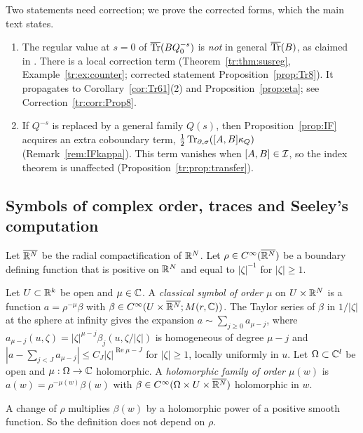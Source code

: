 Two statements need correction; we prove the corrected forms, which the
main text states.
\begin{enumerate}
\item The regular value at \(s=0\) of \(\overline{\operatorname{Tr}}(BQ_0^{-s})\) is \emph{not} in
general \(\overline{\operatorname{Tr}}(B)\), as claimed in \cite[Prop.~8]{MN}. There
is a local correction term (Theorem~\ref{tr:thm:susreg},
Example~\ref{tr:ex:counter}; corrected statement
Proposition~\ref{prop:Tr8}). It propagates to
Corollary~\ref{cor:Tr61}(2) and Proposition~\ref{prop:eta}; see
Correction~\ref{tr:corr:Prop8}.
\item If \(Q^{-s}\) is replaced by a general family \(Q(s)\), then
Proposition~\ref{prop:IF} acquires an extra coboundary term,
\(\frac12\operatorname{Tr}_{\partial,\sigma}([A,B]\kappa_Q)\) (Remark~\ref{rem:IFkappa}). This term vanishes
when \([A,B]\in\mathcal I\), so the index theorem is unaffected
(Proposition~\ref{tr:prop:transfer}).
\end{enumerate}

\subsection{Symbols of complex order, traces and Seeley's computation}
\label{tr:subsec:prelim}

Let \(\overline{\mathbb R^{N}}\) be the radial compactification of \(\mathbb R^N\). Let
\(\rho\in C^\infty(\overline{\mathbb R^{N}})\) be a boundary defining function that is positive on
\(\mathbb R^N\) and equal to \(|\zeta|^{-1}\) for \(|\zeta|\ge1\).

\begin{definition}\label{tr:def:sym}
Let \(U\subset\mathbb R^k\) be open and \(\mu\in\mathbb C\). A \emph{classical symbol of
order \(\mu\)} on \(U\times\mathbb R^N\) is a function \(a=\rho^{-\mu}\beta\) with
\(\beta\in C^\infty(U\times\overline{\mathbb R^{N}};M(r,\mathbb C))\). The Taylor series of \(\beta\) in
\(1/|\zeta|\) at the sphere at infinity gives the expansion
\(a\sim\sum_{j\ge0}a_{\mu-j}\), where
\(a_{\mu-j}(u,\zeta)=|\zeta|^{\mu-j}\beta_j(u,\zeta/|\zeta|)\) is homogeneous
of degree \(\mu-j\) and \(|a-\sum_{j<J}a_{\mu-j}|\le C_J|\zeta|^{\operatorname{Re}
\mu-J}\) for \(|\zeta|\ge1\), locally uniformly in \(u\). Let
\(\Omega\subset\mathbb C^l\) be open and \(\mu:\Omega\to\mathbb C\) holomorphic. A
\emph{holomorphic family of order \(\mu(w)\)} is
\(a(w)=\rho^{-\mu(w)}\beta(w)\) with \(\beta\in C^\infty(\Omega\times U\times
\overline{\mathbb R^{N}})\) holomorphic in \(w\).
\end{definition}

A change of \(\rho\) multiplies \(\beta(w)\) by a holomorphic power of a
positive smooth function. So the definition does not depend on \(\rho\).

